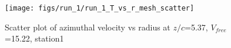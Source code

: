 \begin{figure}[H]
\centering
\texttt{[image: figs/run\_1/run\_1\_T\_vs\_r\_mesh\_scatter]}
\caption{Scatter plot of azimuthal velocity vs radius at $z/c$=5.37, $V_{free}$=15.22, station1}
\label{fig:run_1_T_vs_r_mesh_scatter}
\end{figure}


